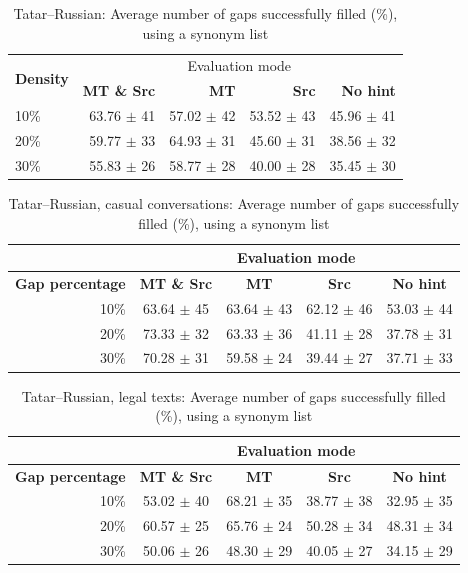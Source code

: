 \documentclass[11pt]{article}
\begin{document}
\begin{table}
\centering
  \begin{tabular}{|l|r|r|r|r|}
    \hline
    \multirow{2}{*}{\textbf{Density}} & \multicolumn{4}{|c|}{Evaluation mode} \\\cline{2-5}
                                            & \textbf{MT \& Src} & \textbf{MT} & \textbf{Src} & \textbf{No hint} \\
\hline
10\%&63.76 \(\pm\) 41&57.02 \(\pm\) 42&53.52 \(\pm\) 43&45.96 \(\pm\) 41\\
20\%&59.77 \(\pm\) 33&64.93 \(\pm\) 31&45.60 \(\pm\) 31&38.56 \(\pm\) 32\\
30\%&55.83 \(\pm\) 26&58.77 \(\pm\) 28&40.00 \(\pm\) 28&35.45 \(\pm\) 30\\
    \hline
  \end{tabular}
  \caption{Tatar--Russian: Average number of gaps successfully filled (\%), using a synonym list}
  \label{table:res-tat-rus}
\end{table}


\begin{table}

\centering
\begin{tabular}{|r |*{4}{c}|}
\hline
  &\multicolumn{4}{c|}{\textbf{Evaluation mode}}\\
\hline
\textbf{Gap percentage} & \textbf{MT \& Src} & \textbf{MT} & \textbf{Src} & \textbf{No hint} \\
\hline
10\%&63.64 \(\pm\) 45&63.64 \(\pm\) 43&62.12 \(\pm\) 46&53.03 \(\pm\) 44\\
20\%&73.33 \(\pm\) 32&63.33 \(\pm\) 36&41.11 \(\pm\) 28&37.78 \(\pm\) 31\\
30\%&70.28 \(\pm\) 31&59.58 \(\pm\) 24&39.44 \(\pm\) 27&37.71 \(\pm\) 33\\
\hline
\end{tabular}
\caption {Tatar--Russian, casual conversations: Average number of gaps successfully filled (\%), using a synonym list} 
\label{table:rus-casual} 
\end{table}

\begin{table}
\centering
\begin{tabular}{|r |*{4}{c}|}
\hline
  &\multicolumn{4}{c|}{\textbf{Evaluation mode}}\\
\hline
\textbf{Gap percentage} & \textbf{MT \& Src} & \textbf{MT} & \textbf{Src} & \textbf{No hint} \\
\hline
10\%&53.02 \(\pm\) 40&68.21 \(\pm\) 35&38.77 \(\pm\) 38&32.95 \(\pm\) 35\\
20\%&60.57 \(\pm\) 25&65.76 \(\pm\) 24&50.28 \(\pm\) 34&48.31 \(\pm\) 34\\
30\%&50.06 \(\pm\) 26&48.30 \(\pm\) 29&40.05 \(\pm\) 27&34.15 \(\pm\) 29\\
\hline
\end{tabular}
\caption {Tatar--Russian, legal texts: Average number of gaps successfully filled (\%), using a synonym list} \label{table:rus-legal} 
\end{table}
\end{document}
